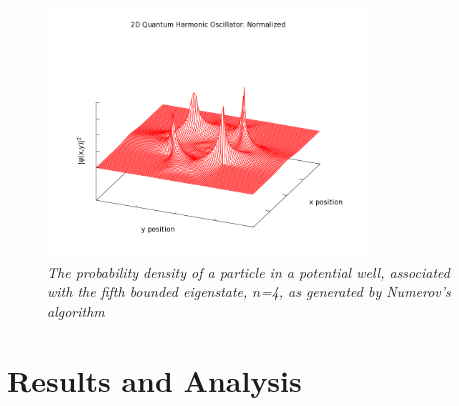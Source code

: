 \documentclass[aps,prl,twocolumn,superscriptaddress]{revtex4-1}
\begin{document}
\begin{figure}[h!]
  \begin{center}
\centerline{\includegraphics[width=3.35in]{2D_psisquared_n4.png}}
\caption{\it \small{The probability density of a particle in a potential well, associated with the fifth bounded eigenstate, $n$=4, as generated by Numerov's algorithm \label{four2}}}
  \end{center}
\end{figure}

\section{Results and Analysis}
\end{document}
